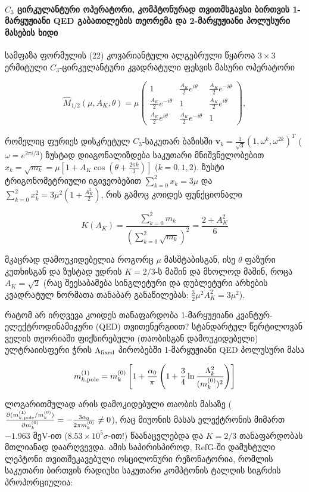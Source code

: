 \documentclass[11pt,a4paper]{article}
\begin{document}
\paragraph{$C_3$ ცირკულანტური ოპერატორი, კომპტონურად თვითმსგავსი ბირთვის 1-მარყუჟიანი QED გაბათილების თეორემა და 2-მარყუჟიანი პოლუსური მასების ხიდი}

სამფაზა ფორმულის (22) კოვარიანტული ალგებრული წყაროა $3\times 3$ ერმიტული $C_3$-ცირკულანტური კვადრატული ფესვის მასური ოპერატორი

\[
\widehat{M}_{1/2}(\mu, A_K, \theta) = \mu\begin{pmatrix} 1 & \frac{A_K}{2}e^{i\theta} & \frac{A_K}{2}e^{-i\theta} \\[4pt] \frac{A_K}{2}e^{-i\theta} & 1 & \frac{A_K}{2}e^{i\theta} \\[4pt] \frac{A_K}{2}e^{i\theta} & \frac{A_K}{2}e^{-i\theta} & 1 \end{pmatrix},
\]

რომელიც ფურიეს დისკრეტულ $C_3$-საკუთარ ბაზისში $\mathbf{v}_k = \frac{1}{\sqrt{3}}(1, \omega^k, \omega^{2k})^T$ ($\omega = e^{2\pi i/3}$) ზუსტად დიაგონალიზდება საკუთარი მნიშვნელობებით $x_k = \sqrt{m_k} = \mu\left[1 + A_K\cos\!\left(\theta + \frac{2\pi k}{3}\right)\right]$ ($k=0,1,2$). ზუსტი ტრიგონომეტრიული იგივეობებით $\sum_{k=0}^2 x_k = 3\mu$ და $\sum_{k=0}^2 x_k^2 = 3\mu^2\left(1 + \frac{A_K^2}{2}\right)$, რის გამოც კოიდეს ფუნქციონალი

\[
K(A_K) = \frac{\sum_{k=0}^2 m_k}{\left(\sum_{k=0}^2 \sqrt{m_k}\right)^2} = \frac{2 + A_K^2}{6}
\]

მკაცრად დამოუკიდებელია როგორც $\mu$ მასშტაბისგან, ისე $\theta$ ფაზური კუთხისგან და ზუსტად უდრის $K = 2/3$-ს მაშინ და მხოლოდ მაშინ, როცა $A_K = \sqrt{2}$ (რაც შეესაბამება სინგლეტური და დუბლეტური არხების კვადრატულ ნორმათა თანაბარ განაწილებას: $\frac{3}{2}\mu^2 A_K^2 = 3\mu^2$).

რატომ არ ირღვევა კოიდეს თანაფარდობა 1-მარყუჟიანი კვანტურ-ელექტროდინამიკური (QED) თვითენერგიით? სტანდარტულ წერტილოვან ველის თეორიაში ფიქსირებული (თაობისგან დამოუკიდებელი) ულტრაიისფერი ჭრის $\Lambda_{\rm fixed}$ პირობებში 1-მარყუჟიანი QED პოლუსური მასა

\[
m_{k,{\rm pole}}^{(1)} = m_k^{(0)}\left[1 + \frac{\alpha_0}{\pi}\left(1 + \frac{3}{4}\ln\frac{\Lambda_k^2}{(m_k^{(0)})^2}\right)\right]
\]

ლოგარითმულად არის დამოკიდებული თაობის მასაზე ($\frac{\partial(m_{k,{\rm pole}}^{(1)}/m_k^{(0)})}{\partial m_k^{(0)}} = -\frac{3\alpha_0}{2\pi m_k^{(0)}} \neq 0$), რაც მიუონის მასას ელექტრონის მიმართ $-1.963\text{ მეV}$-ით ($8.53\times 10^5\sigma$-ით!) წაანაცვლებდა და $K=2/3$ თანაფარდობას მთლიანად დაარღვევდა. ამის საპირისპიროდ, RefG-ში დამუხტული ლეპტონი თვითშეკავებული ოსცილონური რეზონატორია, რომლის საკუთარი ბირთვის რადიუსი საკუთარი კომპტონის ტალღის სიგრძის პროპორციულია:
\end{document}
